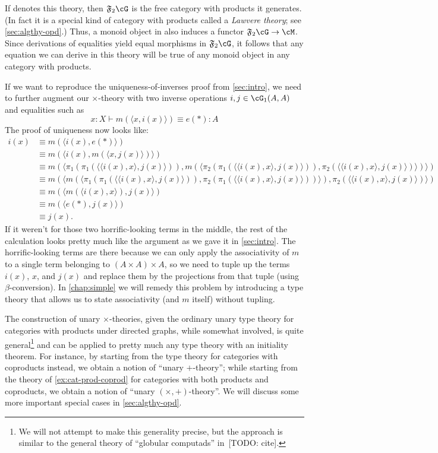\documentclass{book}
\let\types\vdash
\newcommand{\F}[1]{\mathfrak{F}_{#1}}
\def\ttt{\mathord{\ast}}%
\def\pair#1#2{\langle #1,#2\rangle}
\begin{document}
If \cG denotes this theory, then $\F{2}\cG$ is the free category with products it generates.
(In fact it is a special kind of category with products called a \emph{Lawvere theory}; see \cref{sec:algthy-opd}.)
Thus, a monoid object in \cM also induces a functor $\F{2}\cG\to\cM$.
Since derivations of equalities yield equal morphisms in $\F2\cG$, it follows that any equation we can derive in this theory will be true of any monoid object in any category with products.

If we want to reproduce the uniqueness-of-inverses proof from \cref{sec:intro}, we need to further augment our $\times$-theory with two inverse operations $i,j \in \cG_1(A,A)$ and equalities such as
\[ x:X \types m(\pair{x}{i(x)}) \equiv e(\ttt) : A \]
The proof of uniqueness now looks like:
\begin{align*}
  i(x)
  &\equiv m(\pair{i(x)}{e(\ttt)})\\
  &\equiv m(\pair{i(x)}{m(\pair{x}{j(x)})})\\
  &\equiv m(\pair{\pi_1(\pi_1(\pair{\pair{i(x)}{x}}{j(x)}))}{m(\pair{\pi_2(\pi_1(\pair{\pair{i(x)}{x}}{j(x)}))}{\pi_2(\pair{\pair{i(x)}{x}}{j(x)})})})\\
  &\equiv m(\pair{m(\pair{\pi_1(\pi_1(\pair{\pair{i(x)}{x}}{j(x)}))}{\pi_2(\pi_1(\pair{\pair{i(x)}{x}}{j(x)}))})}{\pi_2(\pair{\pair{i(x)}{x}}{j(x)})})\\
  &\equiv m(\pair{m(\pair{i(x)}{x})}{j(x)})\\
  &\equiv m(\pair{e(\ttt)}{j(x)})\\
  &\equiv j(x).
\end{align*}
If it weren't for those two horrific-looking terms in the middle, the rest of the calculation looks pretty much like the argument as we gave it in \cref{sec:intro}.
The horrific-looking terms are there because we can only apply the associativity of $m$ to a single term belonging to $(A\times A)\times A$, so we need to tuple up the terms $i(x)$, $x$, and $j(x)$ and replace them by the projections from that tuple (using $\beta$-conversion).
In \cref{chap:simple} we will remedy this problem by introducing a type theory that allows us to state associativity (and $m$ itself) without tupling.

The construction of unary $\times$-theories, given the ordinary unary type theory for categories with products under directed graphs, while somewhat involved, is quite general\footnote{We will not attempt to make this generality precise, but the approach is similar to the general theory of ``globular computads'' in~[TODO: cite].} and can be applied to pretty much any type theory with an initiality theorem.
For instance, by starting from the type theory for categories with coproducts instead, we obtain a notion of ``unary $+$-theory''; while starting from the theory of \cref{ex:cat-prod-coprod} for categories with both products and coproducts, we obtain a notion of ``unary $(\times,+)$-theory''.
We will discuss some more important special cases in \cref{sec:algthy-opd}.
\end{document}
